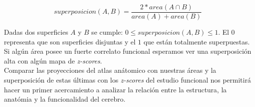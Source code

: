 \begin{equation}
\label{eq:super}
superposicion(A,B) = \frac{ 2 * area(A \cap B) }{area(A) + area(B)}
\end{equation}
 
Dadas dos superficies $A$ y $B$ se cumple: 
$0 \leq superposicion(A,B) \leq 1$. El $0$ representa que son superficies
disjuntas y el $1$ que est\'an totalmente superpuestas. Si alg\'un \'area 
posee un fuerte correlato funcional esperamos ver una superposici\'on alta
con alg\'un mapa de \textit{z-scores}.\\

Comparar las proyecciones del atlas an\'atomico con nuestras \'areas y 
la superposici\'on de estas \'ultimas con los \textit{z-scores} del 
estudio funcional nos permitir\'a hacer un primer acercamiento a 
analizar la relaci\'on entre la estructura, la anat\'omia y la funcionalidad
del cerebro.\\
